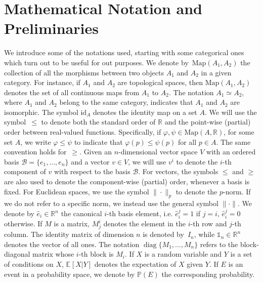 \documentclass[10pt,leqno]{amsart}
\DeclareMathOperator{\diag}{diag}
\newcommand{\sml}{\scriptscriptstyle}
\newcommand{\id}[1]{\text{id}_{\sml #1}}
\newcommand{\R}{\mathbb{R}}
\newcommand{\maps}{\text{Map}}
\newcommand{\prob}{\mathbb{P}}
\newcommand{\E}[2]{\mathbb{E}_{#1}\left[#2\right]}
\begin{document}
\section{Mathematical Notation and Preliminaries}
\label{sec:notations_and_preliminaries}
We introduce some of the notations used, starting with some categorical ones which turn out to be useful for out purposes.
We denote by~$\maps(A_1, A_2)$ the collection of all the morphisms between two objects $A_1$ and $A_2$ in a given category. For instance, if $A_1$ and $A_2$ are topological spaces, then $\maps(A_1, A_2)$ denotes the set of all continuous maps from $A_1$ to $A_2$. The notation $A_1 \simeq A_2$, where $A_1$ and $A_2$ belong to the same category, indicates that $A_1$ and $A_2$ are isomorphic. The symbol $\id{A}$ denotes the identity map on a set $A$. We will use the symbol~$\leq$ to denote both the standard order of $\R$ and the point-wise (partial) order between real-valued functions. Specifically, if $\varphi, \psi \in \maps(A, \R)$, for some set $A$, we write $\varphi \leq \psi$ to indicate that $\varphi(p) \leq \psi(p)$ for all $p \in A$. The same convention holds for~$\geq$. Given an $n$-dimensional vector space $V$ with an ordered basis $\mathcal{B} = \{e_1, \hdots, e_n\}$ and a vector $v \in V$, we will use $v^i$ to denote the $i$-th component of $v$ with respect to the basis $\mathcal{B}$. For vectors, the symbols $\leq$ and $\geq$ are also used to denote the component-wise (partial) order, whenever a basis is fixed. For Euclidean spaces, we use the symbol $\|\cdot\|_{p}$ to denote the $p$-norm. If we do not refer to a specific norm, we instead use the general symbol $\|\cdot\|$. We denote by $\hat{e}_i \in \R^n$ the canonical $i$-th basis element, i.e. $\hat{e}_i^j = 1$ if $j = i$, $\hat{e}_i^j = 0$ otherwise. If $M$ is a matrix, $M_j^i$ denotes the element in the $i$-th row and $j$-th column. The identity matrix of dimension $n$ is denoted by~$I_n$, while $\mathds{1}_n \in \R^n$ denotes the vector of all ones. The notation $\diag\{M_1, \hdots, M_n\}$ refers to the block-diagonal matrix whose $i$-th block is $M_i$. If $X$ is a random variable and $Y$ is a set of conditions on $X$, $\E{}{X | Y}$ denotes the expectation of $X$ given $Y$. If $E$ is an event in a probability space, we denote by $\prob(E)$ the corresponding probability.
\end{document}
